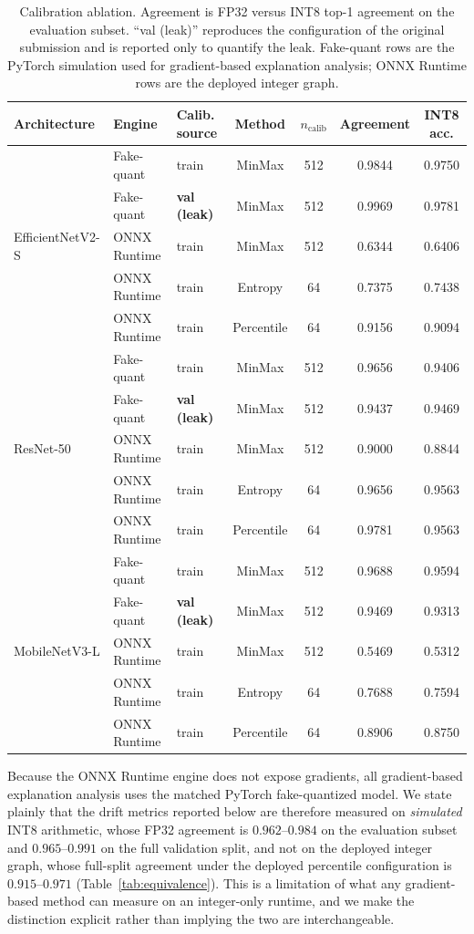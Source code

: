 \documentclass[fleqn,10pt]{wlscirep}
\begin{document}
\begin{table}[!ht]
\centering
\scriptsize
\caption{Calibration ablation. Agreement is FP32 versus INT8 top-1 agreement on the evaluation subset. ``val (leak)'' reproduces the configuration of the original submission and is reported only to quantify the leak. Fake-quant rows are the PyTorch simulation used for gradient-based explanation analysis; ONNX Runtime rows are the deployed integer graph.}
\label{tab:calib_ablation}
\setlength{\tabcolsep}{4pt}
\begin{tabular}{ll l cc cc}
\toprule
\textbf{Architecture} & \textbf{Engine} & \textbf{Calib. source} & \textbf{Method} & \textbf{$n_{\text{calib}}$} & \textbf{Agreement} & \textbf{INT8 acc.} \\
\midrule
\multirow{5}{*}{EfficientNetV2-S}
 & Fake-quant & train & MinMax & 512 & 0.9844 & 0.9750 \\
 & Fake-quant & \textbf{val (leak)} & MinMax & 512 & 0.9969 & 0.9781 \\
 & ONNX Runtime & train & MinMax & 512 & 0.6344 & 0.6406 \\
 & ONNX Runtime & train & Entropy & 64 & 0.7375 & 0.7438 \\
 & ONNX Runtime & train & Percentile & 64 & 0.9156 & 0.9094 \\
\midrule
\multirow{5}{*}{ResNet-50}
 & Fake-quant & train & MinMax & 512 & 0.9656 & 0.9406 \\
 & Fake-quant & \textbf{val (leak)} & MinMax & 512 & 0.9437 & 0.9469 \\
 & ONNX Runtime & train & MinMax & 512 & 0.9000 & 0.8844 \\
 & ONNX Runtime & train & Entropy & 64 & 0.9656 & 0.9563 \\
 & ONNX Runtime & train & Percentile & 64 & 0.9781 & 0.9563 \\
\midrule
\multirow{5}{*}{MobileNetV3-L}
 & Fake-quant & train & MinMax & 512 & 0.9688 & 0.9594 \\
 & Fake-quant & \textbf{val (leak)} & MinMax & 512 & 0.9469 & 0.9313 \\
 & ONNX Runtime & train & MinMax & 512 & 0.5469 & 0.5312 \\
 & ONNX Runtime & train & Entropy & 64 & 0.7688 & 0.7594 \\
 & ONNX Runtime & train & Percentile & 64 & 0.8906 & 0.8750 \\
\bottomrule
\end{tabular}
\end{table}

Because the ONNX Runtime engine does not expose gradients, all gradient-based explanation analysis uses the matched PyTorch fake-quantized model. We state plainly that the drift metrics reported below are therefore measured on \emph{simulated} INT8 arithmetic, whose FP32 agreement is $0.962$--$0.984$ on the evaluation subset and $0.965$--$0.991$ on the full validation split, and not on the deployed integer graph, whose full-split agreement under the deployed percentile configuration is $0.915$--$0.971$ (Table~\ref{tab:equivalence}). This is a limitation of what any gradient-based method can measure on an integer-only runtime, and we make the distinction explicit rather than implying the two are interchangeable.
\end{document}
